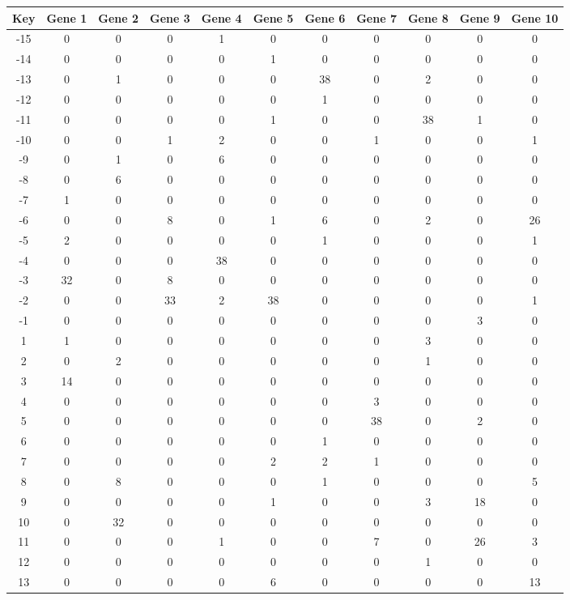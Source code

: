 \begin{tabular}{|c|c|c|c|c|c|c|c|c|c|c|}
\hline
Key & Gene 1 & Gene 2 & Gene 3 & Gene 4 & Gene 5 & Gene 6 & Gene 7 & Gene 8 & Gene 9 & Gene 10 \\
\hline
-15 & 0 & 0 & 0 & 1 & 0 & 0 & 0 & 0 & 0 & 0 \\
-14 & 0 & 0 & 0 & 0 & 1 & 0 & 0 & 0 & 0 & 0 \\
-13 & 0 & 1 & 0 & 0 & 0 & 38 & 0 & 2 & 0 & 0 \\
-12 & 0 & 0 & 0 & 0 & 0 & 1 & 0 & 0 & 0 & 0 \\
-11 & 0 & 0 & 0 & 0 & 1 & 0 & 0 & 38 & 1 & 0 \\
-10 & 0 & 0 & 1 & 2 & 0 & 0 & 1 & 0 & 0 & 1 \\
-9 & 0 & 1 & 0 & 6 & 0 & 0 & 0 & 0 & 0 & 0 \\
-8 & 0 & 6 & 0 & 0 & 0 & 0 & 0 & 0 & 0 & 0 \\
-7 & 1 & 0 & 0 & 0 & 0 & 0 & 0 & 0 & 0 & 0 \\
-6 & 0 & 0 & 8 & 0 & 1 & 6 & 0 & 2 & 0 & 26 \\
-5 & 2 & 0 & 0 & 0 & 0 & 1 & 0 & 0 & 0 & 1 \\
-4 & 0 & 0 & 0 & 38 & 0 & 0 & 0 & 0 & 0 & 0 \\
-3 & 32 & 0 & 8 & 0 & 0 & 0 & 0 & 0 & 0 & 0 \\
-2 & 0 & 0 & 33 & 2 & 38 & 0 & 0 & 0 & 0 & 1 \\
-1 & 0 & 0 & 0 & 0 & 0 & 0 & 0 & 0 & 3 & 0 \\
1 & 1 & 0 & 0 & 0 & 0 & 0 & 0 & 3 & 0 & 0 \\
2 & 0 & 2 & 0 & 0 & 0 & 0 & 0 & 1 & 0 & 0 \\
3 & 14 & 0 & 0 & 0 & 0 & 0 & 0 & 0 & 0 & 0 \\
4 & 0 & 0 & 0 & 0 & 0 & 0 & 3 & 0 & 0 & 0 \\
5 & 0 & 0 & 0 & 0 & 0 & 0 & 38 & 0 & 2 & 0 \\
6 & 0 & 0 & 0 & 0 & 0 & 1 & 0 & 0 & 0 & 0 \\
7 & 0 & 0 & 0 & 0 & 2 & 2 & 1 & 0 & 0 & 0 \\
8 & 0 & 8 & 0 & 0 & 0 & 1 & 0 & 0 & 0 & 5 \\
9 & 0 & 0 & 0 & 0 & 1 & 0 & 0 & 3 & 18 & 0 \\
10 & 0 & 32 & 0 & 0 & 0 & 0 & 0 & 0 & 0 & 0 \\
11 & 0 & 0 & 0 & 1 & 0 & 0 & 7 & 0 & 26 & 3 \\
12 & 0 & 0 & 0 & 0 & 0 & 0 & 0 & 1 & 0 & 0 \\
13 & 0 & 0 & 0 & 0 & 6 & 0 & 0 & 0 & 0 & 13 \\
\hline
\end{tabular}